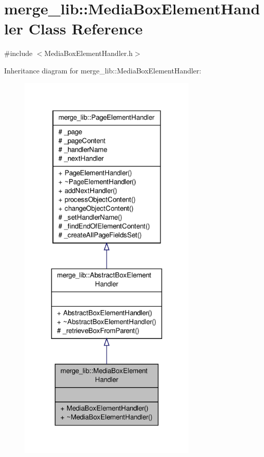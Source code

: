 \hypertarget{classmerge__lib_1_1_media_box_element_handler}{\section{merge\-\_\-lib\-:\-:Media\-Box\-Element\-Handler Class Reference}
\label{d2/d83/classmerge__lib_1_1_media_box_element_handler}
}


{\ttfamily \#include $<$Media\-Box\-Element\-Handler.\-h$>$}



Inheritance diagram for merge\-\_\-lib\-:\-:Media\-Box\-Element\-Handler\-:
\nopagebreak
\begin{figure}[H]
\begin{center}
\leavevmode
\includegraphics[width=240pt]{d4/da5/classmerge__lib_1_1_media_box_element_handler__inherit__graph}
\end{center}
\end{figure}


